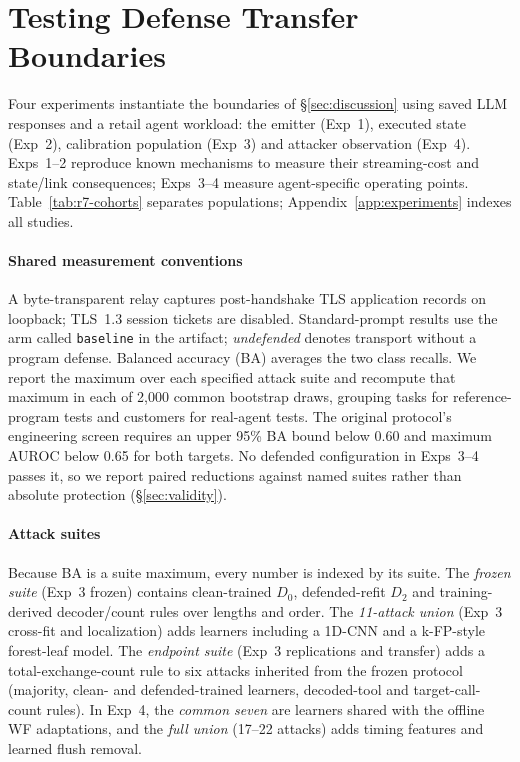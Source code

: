 \section{Testing Defense Transfer Boundaries}\label{sec:controlled-placement}\label{sec:tau-cover-bridge}
Four experiments instantiate the boundaries of \S\ref{sec:discussion} using saved LLM responses and a retail agent workload: the emitter (Exp~1), executed state (Exp~2), calibration population (Exp~3) and attacker observation (Exp~4). Exps~1--2 reproduce known mechanisms to measure their streaming-cost and state/link consequences; Exps~3--4 measure agent-specific operating points. Table~\ref{tab:r7-cohorts} separates populations; Appendix~\ref{app:experiments} indexes all studies.

\paragraph{Shared measurement conventions}
A byte-transparent relay captures post-handshake TLS application records on loopback; TLS~1.3 session tickets are disabled. Standard-prompt results use the arm called \texttt{baseline} in the artifact; \emph{undefended} denotes transport without a program defense. Balanced accuracy (BA) averages the two class recalls. We report the maximum over each specified attack suite and recompute that maximum in each of 2,000 common bootstrap draws, grouping tasks for reference-program tests and customers for real-agent tests. The original protocol's engineering screen requires an upper 95\% BA bound below 0.60 and maximum AUROC below 0.65 for both targets. No defended configuration in Exps~3--4 passes it, so we report paired reductions against named suites rather than absolute protection (\S\ref{sec:validity}).

\paragraph{Attack suites}
Because BA is a suite maximum, every number is indexed by its suite. The \emph{frozen suite} (Exp~3 frozen) contains clean-trained $D_0$, defended-refit $D_2$ and training-derived decoder/count rules over lengths and order. The \emph{11-attack union} (Exp~3 cross-fit and localization) adds learners including a 1D-CNN and a k-FP-style forest-leaf model. The \emph{endpoint suite} (Exp~3 replications and transfer) adds a total-exchange-count rule to six attacks inherited from the frozen protocol (majority, clean- and defended-trained learners, decoded-tool and target-call-count rules). In Exp~4, the \emph{common seven} are learners shared with the offline WF adaptations, and the \emph{full union} (17--22 attacks) adds timing features and learned flush removal.


